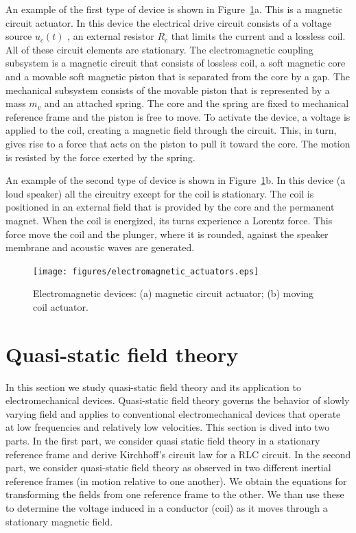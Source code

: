 \documentclass[11pt,a4paper,oneside]{book}
\numberwithin{equation}{section}
\theoremstyle{it}
\theoremstyle{definition}
\begin{document}
An example of the first type of device is shown in Figure~\ref{electromagnetic_actuators}a. This is a magnetic circuit actuator. In this device the electrical drive circuit consists of a voltage source $u_c(t)$ , an external resistor $R_c$ that limits the current and a lossless coil. All of these circuit elements are stationary. The electromagnetic coupling subsystem is a magnetic circuit that consists of lossless coil, a soft magnetic core and a movable soft magnetic piston that is separated from the core by a gap. The mechanical subsystem consists of the movable piston that is represented by a mass $m_v$ and an attached spring. The core and the spring are fixed to  mechanical reference frame and the piston is free to move. To activate the device, a voltage is applied to the coil, creating a magnetic field through the circuit. This, in turn, gives rise to a force that acts on the piston to pull it toward the core. The motion is resisted by the force exerted by the spring.

An example of the second type of device is shown in Figure~\ref{electromagnetic_actuators}b. In this device (a loud speaker) all the circuitry except for the coil is stationary. The coil is positioned in an external field that is provided by the core and the permanent magnet. When the coil is energized, its turns experience a Lorentz force. This force move the coil and the plunger, where it is rounded, against the speaker membrane and acoustic waves are generated.

\begin{figure}[H]
	\centering
	\texttt{[image: figures/electromagnetic\_actuators.eps]}
	\captionsetup{width=0.75\textwidth}		
	\caption{Electromagnetic devices: (a) magnetic circuit actuator; (b) moving coil actuator.}
	\label{electromagnetic_actuators}
\end{figure}


\section{Quasi-static field theory}
In this section we study quasi-static field theory and its application to electromechanical devices. Quasi-static field theory governs the behavior of slowly  varying field and applies to conventional electromechanical devices that operate at low frequencies and relatively low velocities. This section is dived into two parts. In the first part, we consider quasi static field theory in a stationary reference frame and derive Kirchhoff's circuit law for a RLC circuit. In the second part, we consider quasi-static field theory as observed in two different inertial reference frames (in motion relative to one another). We obtain the equations for transforming the fields from one reference frame to the other. We than use these to determine the voltage induced in a conductor (coil) as it moves through a stationary magnetic field.
\end{document}
